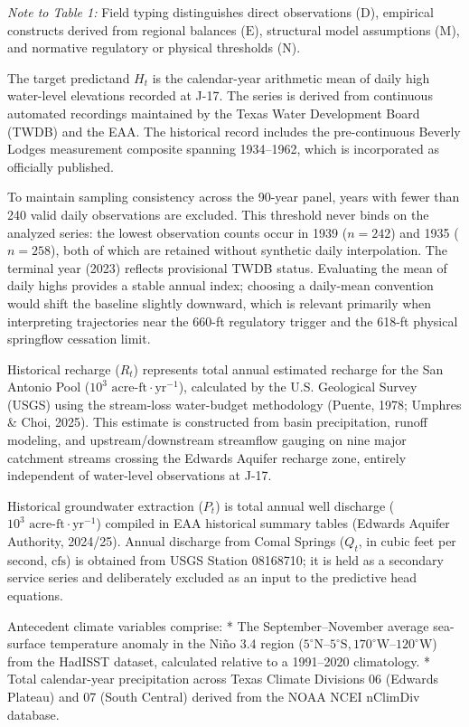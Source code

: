 \documentclass[11pt]{article}
\begin{document}
\emph{Note to Table 1:} Field typing distinguishes direct observations
(\(\mathrm{D}\)), empirical constructs derived from regional balances
(\(\mathrm{E}\)), structural model assumptions (\(\mathrm{M}\)), and
normative regulatory or physical thresholds (\(\mathrm{N}\)).

The target predictand \(H_t\) is the calendar-year arithmetic mean of
daily high water-level elevations recorded at J-17. The series is
derived from continuous automated recordings maintained by the Texas
Water Development Board (TWDB) and the EAA. The historical record
includes the pre-continuous Beverly Lodges measurement composite
spanning 1934--1962, which is incorporated as officially published.

To maintain sampling consistency across the 90-year panel, years with
fewer than 240 valid daily observations are excluded. This threshold
never binds on the analyzed series: the lowest observation counts occur
in 1939 (\(n = 242\)) and 1935 (\(n = 258\)), both of which are retained
without synthetic daily interpolation. The terminal year (2023) reflects
provisional TWDB status. Evaluating the mean of daily highs provides a
stable annual index; choosing a daily-mean convention would shift the
baseline slightly downward, which is relevant primarily when
interpreting trajectories near the 660-ft regulatory trigger and the
618-ft physical springflow cessation limit.

Historical recharge (\(R_t\)) represents total annual estimated recharge
for the San Antonio Pool (\(10^3\text{ acre-ft}\cdot\text{yr}^{-1}\)),
calculated by the U.S. Geological Survey (USGS) using the stream-loss
water-budget methodology (Puente, 1978; Umphres \& Choi, 2025). This
estimate is constructed from basin precipitation, runoff modeling, and
upstream/downstream streamflow gauging on nine major catchment streams
crossing the Edwards Aquifer recharge zone, entirely independent of
water-level observations at J-17.

Historical groundwater extraction (\(P_t\)) is total annual well
discharge (\(10^3\text{ acre-ft}\cdot\text{yr}^{-1}\)) compiled in EAA
historical summary tables (Edwards Aquifer Authority, 2024/25). Annual
discharge from Comal Springs (\(Q_t\), in cubic feet per second,
\(\text{cfs}\)) is obtained from USGS Station 08168710; it is held as a
secondary service series and deliberately excluded as an input to the
predictive head equations.

Antecedent climate variables comprise: * The September--November average
sea-surface temperature anomaly in the Niño 3.4 region
(\(5^\circ\text{N}–5^\circ\text{S}, 170^\circ\text{W}–120^\circ\text{W}\))
from the HadISST dataset, calculated relative to a 1991--2020
climatology. * Total calendar-year precipitation across Texas Climate
Divisions 06 (Edwards Plateau) and 07 (South Central) derived from the
NOAA NCEI nClimDiv database.
\end{document}
